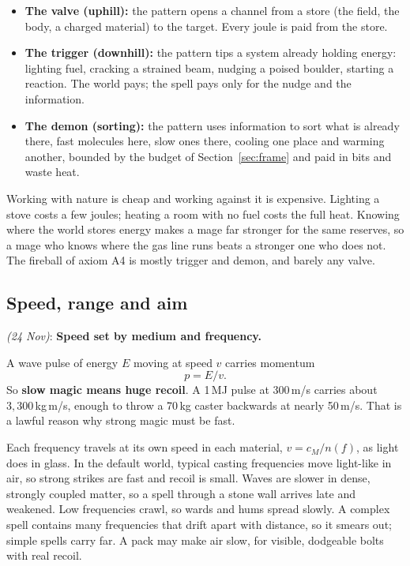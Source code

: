 \documentclass[11pt,a4paper]{article}
\newcommand{\decision}[3]{\par\smallskip\noindent{\color{dec}\textbf{Decision #1}} \textit{(#2)}: \textbf{#3}\par}
\begin{document}
\begin{itemize}
  \item \textbf{The valve (uphill):} the pattern opens a channel from a store (the field, the body, a charged material) to the target. Every joule is paid from the store.
  \item \textbf{The trigger (downhill):} the pattern tips a system already holding energy: lighting fuel, cracking a strained beam, nudging a poised boulder, starting a reaction. The world pays; the spell pays only for the nudge and the information.
  \item \textbf{The demon (sorting):} the pattern uses information to sort what is already there, fast molecules here, slow ones there, cooling one place and warming another, bounded by the budget of Section~\ref{sec:frame} and paid in bits and waste heat.
\end{itemize}
Working with nature is cheap and working against it is expensive. Lighting a stove costs a few joules; heating a room with no fuel costs the full heat. Knowing where the world stores energy makes a mage far stronger for the same reserves, so a mage who knows where the gas line runs beats a stronger one who does not. The fireball of axiom A4 is mostly trigger and demon, and barely any valve.

\subsection{Speed, range and aim}

\decision{Q4.2}{24 Nov}{Speed set by medium and frequency.}

A wave pulse of energy $E$ moving at speed $v$ carries momentum
\begin{equation}
  p = E/v .
\end{equation}
So \textbf{slow magic means huge recoil}. A 1\,MJ pulse at 300\,m/s carries about $3{,}300$\,kg\,m/s, enough to throw a 70\,kg caster backwards at nearly 50\,m/s. That is a lawful reason why strong magic must be fast.

Each frequency travels at its own speed in each material, $v = c_M/n(f)$, as light does in glass. In the default world, typical casting frequencies move light-like in air, so strong strikes are fast and recoil is small. Waves are slower in dense, strongly coupled matter, so a spell through a stone wall arrives late and weakened. Low frequencies crawl, so wards and hums spread slowly. A complex spell contains many frequencies that drift apart with distance, so it smears out; simple spells carry far. A pack may make air slow, for visible, dodgeable bolts with real recoil.
\end{document}
